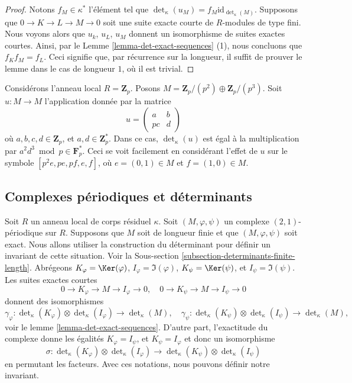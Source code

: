 \begin{proof}
Notons $f_M \in \kappa^*$ l'élément tel que
$\det\nolimits_\kappa(u_M) = f_M \text{id}_{\det\nolimits_\kappa(M)}$.
Supposons que $0 \to K \to L \to M \to 0$ soit une suite exacte
courte de $R$-modules de type fini. Nous voyons alors que
$u_k$, $u_L$, $u_M$ donnent un isomorphisme de suites exactes courtes.
Ainsi, par le Lemme \ref{lemma-det-exact-sequences} (1), nous concluons que
$f_K f_M = f_L$.
Ceci signifie que, par récurrence sur la longueur, il suffit de prouver le
lemme dans le cas de longueur $1$, où il est trivial.
\end{proof}

\begin{example}
\label{example-determinant-map}
Considérons l'anneau local $R = \mathbf{Z}_p$.
Posons $M = \mathbf{Z}_p/(p^2) \oplus \mathbf{Z}_p/(p^3)$.
Soit $u : M \to M$ l'application donnée par la matrice
$$
u =
\left(
\begin{matrix}
a & b \\
pc & d
\end{matrix}
\right)
$$
où $a, b, c, d \in \mathbf{Z}_p$, et $a, d \in \mathbf{Z}_p^*$.
Dans ce cas, $\det_\kappa(u)$ est égal à la multiplication par
$a^2d^3 \bmod p \in \mathbf{F}_p^*$. Ceci se voit facilement
en considérant l'effet de $u$ sur le symbole
$[p^2e, pe, pf, e, f]$, où $e = (0 , 1) \in M$ et
$f = (1, 0) \in M$.
\end{example}





\subsection{Complexes périodiques et déterminants}
\label{subsection-periodic-complexes-determinants}

\noindent
Soit $R$ un anneau local de corps résiduel $\kappa$.
Soit $(M, \varphi, \psi)$ un complexe $(2, 1)$-périodique sur $R$.
Supposons que $M$ soit de longueur finie et que $(M, \varphi, \psi)$ soit
exact. Nous allons utiliser la construction du déterminant pour définir
un invariant de cette situation. Voir la
Sous-section \ref{subsection-determinants-finite-length}.
Abrégeons
$K_\varphi = \Ker(\varphi)$,
$I_\varphi = \Im(\varphi)$,
$K_\psi = \Ker(\psi)$, et
$I_\psi = \Im(\psi)$.
Les suites exactes courtes
$$
0 \to K_\varphi \to M \to I_\varphi \to 0, \quad
0 \to K_\psi \to M \to I_\psi \to 0
$$
donnent des isomorphismes
$$
\gamma_\varphi :
\det\nolimits_\kappa(K_\varphi)
\otimes
\det\nolimits_\kappa(I_\varphi)
\longrightarrow
\det\nolimits_\kappa(M), \quad
\gamma_\psi :
\det\nolimits_\kappa(K_\psi)
\otimes
\det\nolimits_\kappa(I_\psi)
\longrightarrow
\det\nolimits_\kappa(M),
$$
voir le lemme \ref{lemma-det-exact-sequences}.
D'autre part, l'exactitude du complexe donne les égalités
$K_\varphi = I_\psi$, et $K_\psi = I_\varphi$
et donc un isomorphisme
$$
\sigma :
\det\nolimits_\kappa(K_\varphi)
\otimes
\det\nolimits_\kappa(I_\varphi)
\longrightarrow
\det\nolimits_\kappa(K_\psi)
\otimes
\det\nolimits_\kappa(I_\psi)
$$
en permutant les facteurs. Avec ces notations, nous pouvons définir notre invariant.

